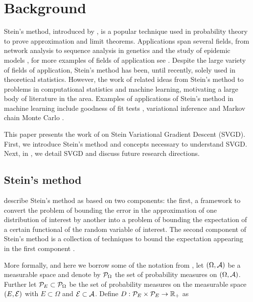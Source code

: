 

\section{Background}

Stein's method, introduced by \citet{stein1972bound}, is a popular technique used in probability theory to prove approximation and limit theorems. Applications span several fields, from network analysis \citep{Franceschetti:2006:CNL:1148663.1148705} to sequence analysis in genetics \citep{reinert2000probabilistic} and the study of epidemic models \citep{ball1990poisson}, for more examples of fields of application see \cite{reinert2011short}. Despite the large variety of fields of application, Stein's method has been, until recently, solely used in theoretical statistics. However, the work of \citep{oates2017control,oates2019convergence,gorham2015measuring, liu2016kernelized} related ideas from Stein's method to problems in computational statistics and machine learning, motivating a large body of literature in the area. Examples of  applications of Stein's method in machine learning include goodness of fit tests \cite{liu2016kernelized,chwialkowski2016kernel,yang2019stein, kanagawa2019kernel}, variational inference \cite{liu2016stein,zhuo2017message, wang2017stein, han2018stein} and Markov chain Monte Carlo \cite{shaloudegi2018adaptive,chen2019stein}. 

This paper presents the work of \citet{liu2016stein} on Stein Variational Gradient Descent (SVGD). First, we introduce Stein's method and concepts necessary to understand SVGD. Next, in , we detail SVGD and discuss future research directions.

\subsection{Stein's method}\label{stein_def}
\citet{ross2011fundamentals} describe Stein's method as based on two components: the first, a framework to convert the problem of bounding the error in the approximation of one distribution of interest by another into a problem of bounding the expectation of a certain functional of the random variable of interest. The second component of Stein’s method is a collection of techniques to bound the expectation appearing in the first component \cite{ross2011fundamentals}.

More formally, and here we borrow some of the notation from \cite{barp2019minimum}, let $(\Omega, \mathcal{A})$ be a measurable space and denote by $\mathcal{P}_{\Omega}$  the set of probability measures on $(\Omega, \mathcal{A})$. Further let $\mathcal{P}_{E} \subset \mathcal{P}_{\Omega}$ be the set of probability measures on the measurable space $(E, \mathcal{E})$ with $E \subset \Omega$ and $\mathcal{E} \subset \mathcal{A}$. Define $D: \mathcal{P}_{E} \times \mathcal{P}_{E} \rightarrow \mathbb{R}_+$ as

